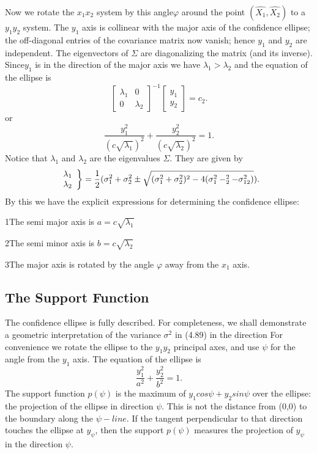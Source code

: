 Now we rotate the $x_1x_2$ system by this angle$\varphi$ around the point $(\hat{X_1},\hat{X_2})$ to a $y_1y_2$ system. The $y_1$ axis is collinear with the major axis of the confidence ellipse; the off-diagonal entries of the covariance matrix now vanish; hence $y_1$ and $y_2$ are independent. The eigenvectors of $\Sigma$ are diagonalizing the matrix (and its inverse). Since$y_1$ is in the direction of the major axis we have $\lambda_1>\lambda_2$ and the equation of the ellipse is
\begin{equation}
[y_1\;y_2]
\begin{bmatrix}
\lambda_1 & 0\\
0 & \lambda_2
\end{bmatrix}^{-1}
\begin{bmatrix}
y_1 \\y_2
\end{bmatrix}
=c_2.
\end{equation}
or
\begin{equation}
\frac{y^2_1}{(c\sqrt{\lambda_1})^2}+\frac{y^2_2}{(c\sqrt{\lambda_2})^2}=1.
\end{equation}
Notice that $\lambda_1$ and $\lambda_2$ are the eigenvalues $\Sigma$. They are given by
\begin{equation}
\left.
\begin{array}{c c}
\lambda_1 \\ \lambda_2
\end{array}
\right\rbrace
=\frac{1}{2}(\sigma^2_1+\sigma^2_2\pm \sqrt{(\sigma^2_1+\sigma^2_2)^2-4(\sigma^2_1-^2_2-\sigma^2_{12})}).
\end{equation}
By this we have the explicit expressions for determining the confidence ellipse:

1\;The semi major axis is $a=c\sqrt{\lambda_1}$

2\;The semi minor axis is $b=c\sqrt{\lambda_2}$

3\;The major axis is rotated by the angle $\varphi$ away from the $x_1$ axis. 

	\subsection{The Support Function}
	The confidence ellipse is fully described. For completeness, we shall demonstrate a geometric interpretation of the variance $\sigma^2$ in (4.89) in the direction For convenience we rotate the ellipse to the $y_1y_2$ principal axes, and use $\psi$ for the angle from the $y_1$ axis. The equation of the ellipse is
	\begin{equation}
	\frac{y^2_1}{a^2}+\frac{y^2_2}{b^2}=1.
	\end{equation}
	The support function $p(\psi)$ is the maximum of $y_1cos\psi+y_2sin\psi$ over the ellipse: the
	projection of the ellipse in direction $\psi$. This is not the distance from (0,0) to the boundary along the $\psi-line$. If the tangent perpendicular to that direction touches the ellipse at $y_\psi$, then the support $p(\psi)$ measures the projection of $y_\psi$ in the direction $\psi$.
	
